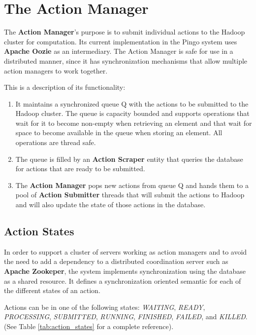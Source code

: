 \section{The Action Manager}
The \textbf{Action Manager}'s purpose is to submit individual actions to the Hadoop cluster for computation. Its current implementation in the Pingo system uses \textbf{Apache Oozie} as an intermediary. The Action Manager is safe for use in a distributed manner, since it has synchronization mechanisms that allow multiple action managers to work together.  

This is a description of its functionality:
\begin{enumerate}
\item It maintains a synchronized queue Q with the actions to be submitted to the Hadoop cluster. The queue is capacity bounded and supports operations that wait for it to become non-empty when retrieving an element and that wait for space to become available in the queue when storing an element. All operations are thread safe.
\item The queue is filled by an \textbf{Action Scraper} entity that queries the database for actions that are ready to be submitted.
\item The \textbf{Action Manager} pops new actions from queue Q and hands them to a pool of \textbf{Action Submitter} threads that will submit the actions to Hadoop and will also update the state of those actions in the database.
\end{enumerate}

\subsection{Action States}
In order to support a cluster of servers working as action managers and to avoid the need to add a dependency to a distributed coordination server such as \textbf{Apache Zookeper}, the system implements synchronization using the database as a shared resource.  It defines a synchronization oriented semantic for each of the different states of an action.

Actions can be in one of the following states: \textit{WAITING}, \textit{READY}, \textit{PROCESSING}, \textit{SUBMITTED}, \textit{RUNNING}, \textit{FINISHED}, \textit{FAILED}, and \textit{KILLED}.  (See Table \ref{tab:action_states} for a complete reference).


